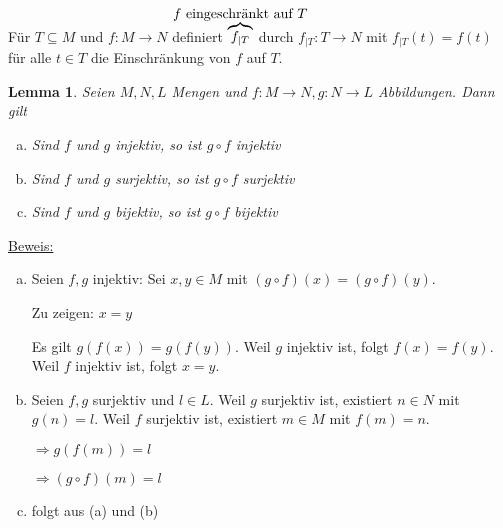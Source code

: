 \documentclass{scrreprt}
\newtheorem*{lemma}{Lemma}
\begin{document}
Für $T \subseteq M$ und $f \colon M \to N$ definiert
$\overset{\makebox[0pt]{$f$ eingeschränkt auf $T$}}{\overbrace{f_{|T}}}$
durch $f_{|T} \colon T \to N$ mit $f_{|T}(t) = f(t)$ für alle $t \in T$ die
Einschränkung von $f$ auf $T$.

\begin{lemma}
  Seien $M, N, L$ Mengen und $f \colon M \to N, g \colon N \to L$ Abbildungen.
  Dann gilt
  \begin{enumerate}[(a)]
  \item Sind $f$ und $g$ injektiv, so ist $g \circ f$ injektiv
  \item Sind $f$ und $g$ surjektiv, so ist $g \circ f$ surjektiv
  \item Sind $f$ und $g$ bijektiv, so ist $g \circ f$ bijektiv
  \end{enumerate}
\end{lemma}

\underline{Beweis:}
\begin{enumerate}[(a)]
\item Seien $f, g$ injektiv: Sei $x, y \in M$ mit
  $(g \circ f)(x) = (g \circ f)(y)$.

  Zu zeigen: $x = y$

  Es gilt $g(f(x)) = g(f(y))$.
  Weil $g$ injektiv ist, folgt $f(x) = f(y)$.
  Weil $f$ injektiv ist, folgt $x = y$.

\item Seien $f, g$ surjektiv und $l \in L$.
  Weil $g$ surjektiv ist, existiert $n \in N$ mit
  $g(n) = l$.
  Weil $f$ surjektiv ist, existiert $m \in M$ mit
  $f(m) = n$.

  $\Rightarrow g(f(m)) = l$

  $\Rightarrow (g \circ f)(m) = l$

\item folgt aus (a) und (b)
\end{enumerate}
\end{document}
